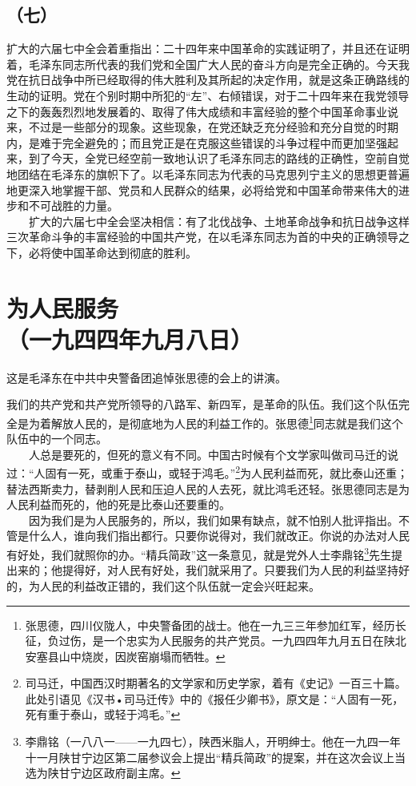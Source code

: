 \documentclass[cn,11pt,chinese]{elegantbook}
\def\myformat#1{\hfil\hfil #1}
\begin{document}
\subsection*{\myformat{（七）}}
扩大的六届七中全会着重指出：二十四年来中国革命的实践证明了，并且还在证明着，毛泽东同志所代表的我们党和全国广大人民的奋斗方向是完全正确的。今天我党在抗日战争中所已经取得的伟大胜利及其所起的决定作用，就是这条正确路线的生动的证明。党在个别时期中所犯的“左”、右倾错误，对于二十四年来在我党领导之下的轰轰烈烈地发展着的、取得了伟大成绩和丰富经验的整个中国革命事业说来，不过是一些部分的现象。这些现象，在党还缺乏充分经验和充分自觉的时期内，是难于完全避免的；而且党正是在克服这些错误的斗争过程中而更加坚强起来，到了今天，全党已经空前一致地认识了毛泽东同志的路线的正确性，空前自觉地团结在毛泽东的旗帜下了。以毛泽东同志为代表的马克思列宁主义的思想更普遍地更深入地掌握干部、党员和人民群众的结果，必将给党和中国革命带来伟大的进步和不可战胜的力量。\\
　　扩大的六届七中全会坚决相信：有了北伐战争、土地革命战争和抗日战争这样三次革命斗争的丰富经验的中国共产党，在以毛泽东同志为首的中央的正确领导之下，必将使中国革命达到彻底的胜利。\\
\newpage\section*{\myformat{为人民服务}\\\myformat{（一九四四年九月八日）}}
\begin{introduction}\item  这是毛泽东在中共中央警备团追悼张思德的会上的讲演。\end{introduction}
我们的共产党和共产党所领导的八路军、新四军，是革命的队伍。我们这个队伍完全是为着解放人民的，是彻底地为人民的利益工作的。张思德\footnote[1]{ 张思德，四川仪陇人，中央警备团的战士。他在一九三三年参加红军，经历长征，负过伤，是一个忠实为人民服务的共产党员。一九四四年九月五日在陕北安塞县山中烧炭，因炭窑崩塌而牺牲。}同志就是我们这个队伍中的一个同志。\\
　　人总是要死的，但死的意义有不同。中国古时候有个文学家叫做司马迁的说过：“人固有一死，或重于泰山，或轻于鸿毛。”\footnote[2]{ 司马迁，中国西汉时期著名的文学家和历史学家，着有《史记》一百三十篇。此处引语见《汉书•司马迁传》中的《报任少卿书》，原文是：“人固有一死，死有重于泰山，或轻于鸿毛。”}为人民利益而死，就比泰山还重；替法西斯卖力，替剥削人民和压迫人民的人去死，就比鸿毛还轻。张思德同志是为人民利益而死的，他的死是比泰山还要重的。\\
　　因为我们是为人民服务的，所以，我们如果有缺点，就不怕别人批评指出。不管是什么人，谁向我们指出都行。只要你说得对，我们就改正。你说的办法对人民有好处，我们就照你的办。“精兵简政”这一条意见，就是党外人士李鼎铭\footnote[3]{ 李鼎铭（一八八一——一九四七），陕西米脂人，开明绅士。他在一九四一年十一月陕甘宁边区第二届参议会上提出“精兵简政”的提案，并在这次会议上当选为陕甘宁边区政府副主席。}先生提出来的；他提得好，对人民有好处，我们就采用了。只要我们为人民的利益坚持好的，为人民的利益改正错的，我们这个队伍就一定会兴旺起来。\\
\end{document}
